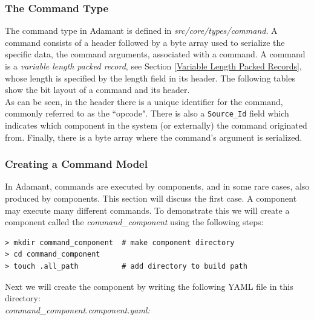 \subsubsection{The Command Type}

The command type in Adamant is defined in \textit{src/core/types/command}. A command consists of a header followed by a byte array used to serialize the specific data, the command arguments, associated with a command. A command is a \textit{variable length packed record}, see Section \ref{Variable Length Packed Records}, whose length is specified by the length field in its header. The following tables show the bit layout of a command and its header. \\




As can be seen, in the header there is a unique identifier for the command, commonly referred to as the ``opcode". There is also a \texttt{Source\_Id} field which indicates which component in the system (or externally) the command originated from. Finally, there is a byte array where the command's argument is serialized. \\

\subsubsection{Creating a Command Model}

In Adamant, commands are executed by components, and in some rare cases, also produced by components. This section will discuss the first case. A component may execute many different commands. To demonstrate this we will create a component called the \textit{command\_component} using the following steps:

\vspace{5mm} %
\begin{verbatim}
> mkdir command_component  # make component directory
> cd command_component 
> touch .all_path          # add directory to build path
\end{verbatim}
\vspace{5mm} %

Next we will create the component by writing the following YAML file in this directory: \\

\textit{command\_component.component.yaml:}

